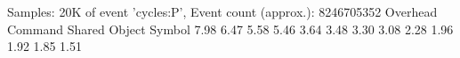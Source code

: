 \begtt
Samples: 20K of event 'cycles:P', Event count (approx.): 8246705352
Overhead  Command  Shared Object                                       Symbol
   7.98%
   6.47%
   5.58%
   5.46%
   3.64%
   3.48%
   3.30%
   3.08%
   2.28%
   1.96%
   1.92%
   1.85%
   1.51%
